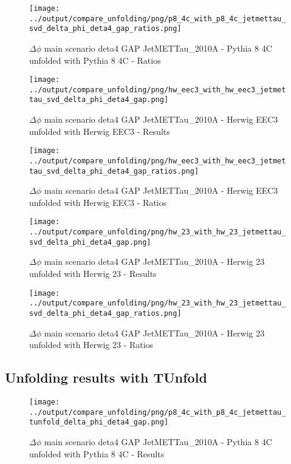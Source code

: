 \documentclass[11pt]{book}
\begin{document}
\begin{figure}[ht]
\centering
\texttt{[image: ../output/compare\_unfolding/png/p8\_4c\_with\_p8\_4c\_jetmettau\_svd\_delta\_phi\_deta4\_gap\_ratios.png]}
\caption{$\Delta\phi$ main scenario deta4 GAP JetMETTau\_2010A - Pythia 8 4C unfolded with Pythia 8 4C - Ratios}
\label{p8_p8_jetmettau_svd_delta_phi_deta4_gap_b}
\end{figure}

\begin{figure}[ht]
\centering
\texttt{[image: ../output/compare\_unfolding/png/hw\_eec3\_with\_hw\_eec3\_jetmettau\_svd\_delta\_phi\_deta4\_gap.png]}
\caption{$\Delta\phi$ main scenario deta4 GAP JetMETTau\_2010A - Herwig EEC3 unfolded with Herwig EEC3 - Results}
\label{hw_eec3_hw_eec3_jetmettau_svd_delta_phi_deta4_gap_a}
\end{figure}

\begin{figure}[ht]
\centering
\texttt{[image: ../output/compare\_unfolding/png/hw\_eec3\_with\_hw\_eec3\_jetmettau\_svd\_delta\_phi\_deta4\_gap\_ratios.png]}
\caption{$\Delta\phi$ main scenario deta4 GAP JetMETTau\_2010A - Herwig EEC3 unfolded with Herwig EEC3 - Ratios}
\label{hw_eec3_hw_eec3_jetmettau_svd_delta_phi_deta4_gap_b}
\end{figure}

\begin{figure}[ht]
\centering
\texttt{[image: ../output/compare\_unfolding/png/hw\_23\_with\_hw\_23\_jetmettau\_svd\_delta\_phi\_deta4\_gap.png]}
\caption{$\Delta\phi$ main scenario deta4 GAP JetMETTau\_2010A - Herwig 23 unfolded with Herwig 23 - Results}
\label{hw_23_hw_23_jetmettau_svd_delta_phi_deta4_gap_a}
\end{figure}

\begin{figure}[ht]
\centering
\texttt{[image: ../output/compare\_unfolding/png/hw\_23\_with\_hw\_23\_jetmettau\_svd\_delta\_phi\_deta4\_gap\_ratios.png]}
\caption{$\Delta\phi$ main scenario deta4 GAP JetMETTau\_2010A - Herwig 23 unfolded with Herwig 23 - Ratios}
\label{hw_23_hw_23_jetmettau_svd_delta_phi_deta4_gap_b}
\end{figure}


\clearpage
\subsection{Unfolding results with TUnfold}

\begin{figure}[ht]
\centering
\texttt{[image: ../output/compare\_unfolding/png/p8\_4c\_with\_p8\_4c\_jetmettau\_tunfold\_delta\_phi\_deta4\_gap.png]}
\caption{$\Delta\phi$ main scenario deta4 GAP JetMETTau\_2010A - Pythia 8 4C unfolded with Pythia 8 4C - Results}
\label{p8_p8_jetmettau_tunfold_delta_phi_deta4_gap_a}
\end{figure}
\end{document}
